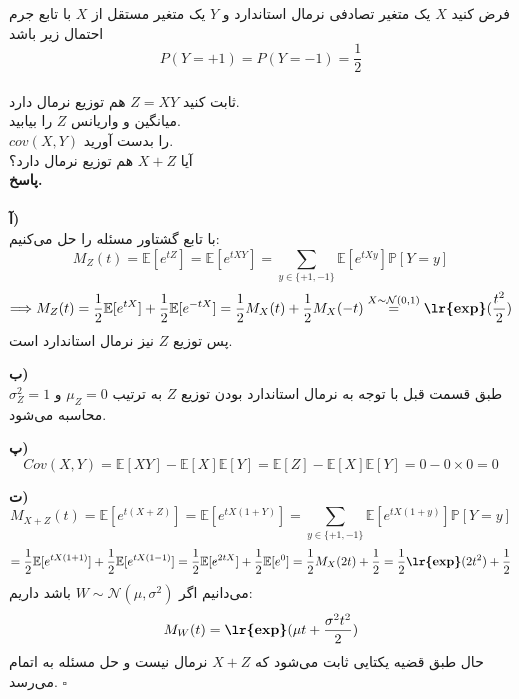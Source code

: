 \problem{}
فرض کنید $X$ یک متغیر تصادفی
نرمال استاندارد 
و $Y$ یک متغیر مستقل از $X$ با تابع جرم احتمال
زیر باشد 
\[
    P(Y = +1) = P(Y = -1) = \frac{1}{2}
\]\\
\subproblem{}
ثابت کنید $Z = XY$ هم توزیع نرمال دارد.\\
\subproblem{}
میانگین و واریانس $Z$ را بیابید.\\
\subproblem{}
$cov(X,Y)$ را بدست آورید.\\
\subproblem{}
آیا $X+Z$ هم توزیع نرمال دارد؟\\


\textbf{پاسخ.}\\
\\
\textbf{آ)}\\
با تابع گشتاور مسئله را حل می‌کنیم:
\[
	M_Z(t)=\mathbb{E}[e^{tZ}]=\mathbb{E}[e^{tXY}]=\sum_{y\in \{+1,-1\}} \mathbb{E}[e^{tXy}]\mathbb{P}[Y=y]
\]
\[
	\Longrightarrow M_Z(t)=\frac{1}{2}\mathbb{E}[e^{tX}]+\frac{1}{2}\mathbb{E}[e^{-tX}] = \frac{1}{2}M_X(t)+\frac{1}{2}M_X(-t) \overset{X\sim \mathcal{N}(0,1)}{=} \textbf{\lr{exp}}(\frac{t^2}{2})
\]
پس توزیع $Z$ نیز نرمال استاندارد است.

\textbf{ب)}\\
طبق قسمت قبل با توجه به نرمال استاندارد بودن توزیع $Z$ به ترتیب $\mu_Z = 0$ و $\sigma_{Z}^2 = 1$ محاسبه می‌شود.

\textbf{پ)}\\
\[
		Cov(X,Y) = \mathbb{E}[XY]-\mathbb{E}[X]\mathbb{E}[Y] = \mathbb{E}[Z] - \mathbb{E}[X]\mathbb{E}[Y] = 0 - 0 \times 0 = 0
\]

\textbf{ت)}\\

\[
	M_{X+Z}(t) = \mathbb{E}[e^{t(X+Z)}] = \mathbb{E}[e^{tX(1+Y)}] = \sum_{y\in \{+1,-1\}} \mathbb{E}[e^{tX(1+y)}]\mathbb{P}[Y=y]
\]
\[	
	= \frac{1}{2}\mathbb{E}[e^{tX(1+1)}] + \frac{1}{2}\mathbb{E}[e^{tX(1-1)}] = \frac{1}{2}\mathbb{E}[e^{2tX}] + \frac{1}{2}\mathbb{E}[e^{0}] = \frac{1}{2}M_X(2t) + \frac{1}{2} = \frac{1}{2}\textbf{\lr{exp}}(2t^2) + \frac{1}{2}
\]
می‌دانیم اگر $W \sim \mathcal{N}(\mu,\sigma^2)$ باشد داریم:
\[
	M_W(t) = \textbf{\lr{exp}}(\mu t + \frac{\sigma^2t^2}{2})
\] 
حال طبق قضیه یکتایی ثابت می‌شود که $X+Z$ نرمال نیست و حل مسئله به اتمام می‌رسد. $\square$



